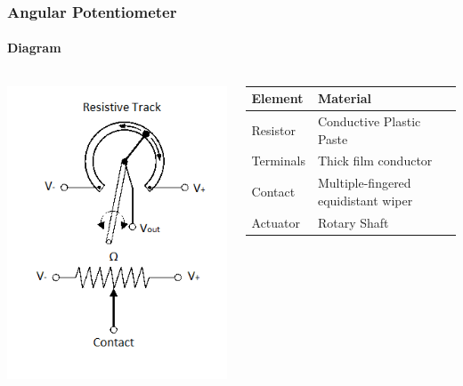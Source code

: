 \documentclass{beamer}
\begin{document}
\begin{frame}
\frametitle{Angular Potentiometer}
\framesubtitle{Diagram}

\begin{columns}[T]
	\begin{column}[T]{0.4\textwidth}
		\includegraphics[width=\textwidth]{Pot2.png}
	\end{column}
	\begin{column}[T]{0.6\textwidth}
		\vspace{0.5cm}
		\begin{tabular}{|p{}| p{}|}
			\hline
			\textbf{Element} & \textbf{Material} \\ \hline
			Resistor & Conductive Plastic Paste\\ \hline
			Terminals & Thick film conductor \\ \hline
			Contact & Multiple-fingered equidistant wiper\\ \hline
			Actuator & Rotary Shaft \\
			\hline
		\end{tabular}
	\end{column}
	
\end{columns}

\end{frame}
\end{document}
